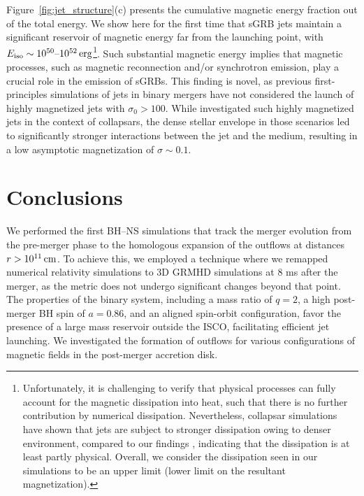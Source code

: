 \documentclass[twocolumn,dvipsnames]{aastex62}
\begin{document}
Figure~\ref{fig:jet_structure}(c) presents the cumulative magnetic energy fraction out of the total energy. We show here for the first time that sGRB jets maintain a significant reservoir of magnetic energy far from the launching point, with $ E_{\rm iso} \sim 10^{50} \mbox{--} 10^{52}\,{\rm erg} $\footnote{Unfortunately, it is challenging to verify that physical processes can fully account for the magnetic dissipation into heat, such that there is no further contribution by numerical dissipation. Nevertheless, collapsar simulations have shown that jets are subject to stronger dissipation owing to denser environment, compared to our findings \citep{Gottlieb2022b}, indicating that the dissipation is at least partly physical. Overall, we consider the dissipation seen in our simulations to be an upper limit (lower limit on the resultant magnetization).
}. Such substantial magnetic energy implies that magnetic processes, such as magnetic reconnection and/or synchrotron emission, play a crucial role in the emission of sGRBs. This finding is novel, as previous first-principles simulations of jets in binary mergers have not considered the launch of highly magnetized jets with $ \sigma_0 > 100 $. While \citet{Gottlieb2022b} investigated such highly magnetized jets in the context of collapsars, the dense stellar envelope in those scenarios led to significantly stronger interactions between the jet and the medium, resulting in a low asymptotic magnetization of $ \sigma \sim 0.1 $.

\section{Conclusions}\label{sec:conclusions}

We performed the first BH--NS simulations that track the merger evolution from the pre-merger phase to the homologous expansion of the outflows at distances $ r > 10^{11}\,{\rm cm} $. To achieve this, we employed a technique where we remapped numerical relativity simulations to 3D GRMHD simulations at 8 ms after the merger, as the metric does not undergo significant changes beyond that point. The properties of the binary system, including a mass ratio of $ q = 2 $, a high post-merger BH spin of $ a = 0.86 $, and an aligned spin-orbit configuration, favor the presence of a large mass reservoir outside the ISCO, facilitating efficient jet launching. We investigated the formation of outflows for various configurations of magnetic fields in the post-merger accretion disk.
\end{document}

